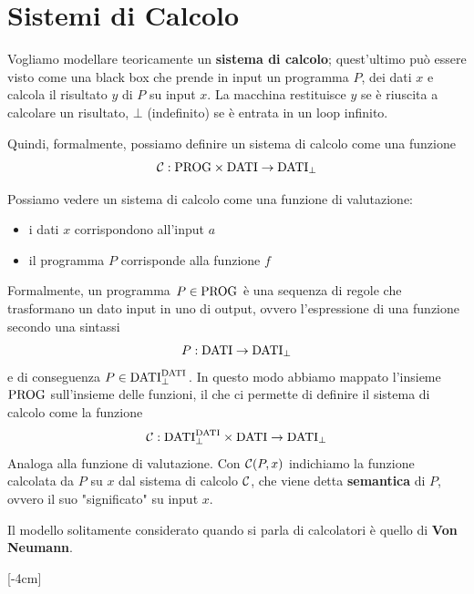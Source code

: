 \section{Sistemi di Calcolo}

Vogliamo modellare teoricamente un \textbf{sistema di calcolo}; quest'ultimo può essere visto come una black box che prende in input un programma $P$, dei dati $x$ e calcola il risultato $y$ di $P$ su input $x$. La macchina restituisce $y$ se è riuscita a calcolare un risultato, $\bot$ (indefinito) se è entrata in un loop infinito.
\begin{center}
	
\end{center}

Quindi, formalmente, possiamo definire un sistema di calcolo come una funzione 
$$ \mathcal{C}: \text{PROG} \times \text{DATI} \rightarrow \text{DATI}_\bot $$

Possiamo vedere un sistema di calcolo come una funzione di valutazione:
\begin{itemize}
	\item i dati $x$ corrispondono all'input $a$
	\item il programma $P$ corrisponde alla funzione $f$
\end{itemize}

Formalmente, un programma $P \in \text{PROG}$ è una sequenza di regole che trasformano un dato input in uno di output, ovvero l'espressione di una funzione secondo una sintassi 
$$ P: \text{DATI} \rightarrow \text{DATI}_\bot $$
e di conseguenza $P \in \text{DATI}^{\text{DATI}}_\bot$. In questo modo abbiamo mappato l'insieme $\text{PROG}$ sull'insieme delle funzioni, il che ci permette di definire il sistema di calcolo come la funzione
$$ \mathcal{C}: \text{DATI}^{\text{DATI}}_\bot \times \text{DATI} \rightarrow \text{DATI}_{\bot} $$
Analoga alla funzione di valutazione. Con $\mathcal{C}(P,x)$ indichiamo la funzione calcolata da $P$ su $x$ dal sistema di calcolo $\mathcal{C}$, che viene detta \textbf{semantica} di $P$, ovvero il suo "significato" su input $x$.

Il modello solitamente considerato quando si parla di calcolatori è quello di \textbf{Von Neumann}.

[-4cm]

